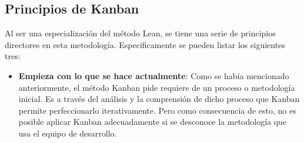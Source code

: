 \subsection{Principios de Kanban}
Al ser una especialización del método Lean, se tiene una serie de principios
directores en esta metodología. Especificamente se pueden listar los siguientes
tres:
\begin{itemize}
    \item \textbf{Empieza con lo que se hace actualmente}: %
    Como se había mencionado anteriormente, el método Kanban pide requiere de un
    proceso o metodología inicial. Es a través del análisis y la comprensión de
    dicho proceso que Kanban permite perfeccionarlo iterativamente. Pero como
    consecuencia de esto, no es posible aplicar Kanban adecuadamente si se
    desconoce la metodología que usa el equipo de desarrollo.


\end{itemize}

